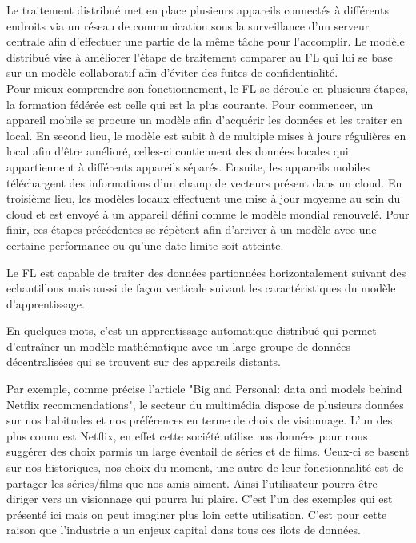 \documentclass[12pt,a4paper]{report}
\begin{document}
Le traitement distribué met en place plusieurs appareils connectés à différents endroits via un réseau de communication sous la surveillance d'un serveur centrale afin d'effectuer une partie de la même tâche pour l'accomplir. Le modèle distribué vise à améliorer l'étape de traitement comparer au FL qui lui se base sur un modèle collaboratif afin d'éviter des fuites de confidentialité.\\

Pour mieux comprendre son fonctionnement, le FL se déroule en plusieurs étapes, la formation fédérée est celle qui est la plus courante. Pour commencer, un appareil mobile se procure un modèle afin d'acquérir les données et les traiter en local. En second lieu, le modèle est subit à de multiple mises à jours régulières en local afin d'être amélioré, celles-ci contiennent des données locales qui appartiennent à différents appareils séparés. Ensuite, les appareils mobiles téléchargent des informations d'un champ de vecteurs présent dans un cloud. En troisième lieu, les modèles locaux effectuent une mise à jour moyenne au sein du cloud et est envoyé à un appareil défini comme le modèle mondial renouvelé. Pour finir, ces étapes précédentes se répètent afin d'arriver à un modèle avec une certaine performance ou qu'une date limite soit atteinte.

Le FL est capable de traiter des données partionnées horizontalement suivant des echantillons mais aussi de façon verticale suivant les caractéristiques du modèle d'apprentissage.

En quelques mots, c'est un apprentissage automatique distribué qui permet d'entraîner un modèle mathématique avec un large groupe de données décentralisées qui se trouvent sur des appareils distants.

Par exemple, comme précise l'article "Big and Personal: data and models behind Netflix recommendations", le secteur du multimédia dispose de plusieurs données sur nos habitudes et nos préférences en terme de choix de visionnage. L'un des plus connu est Netflix, en effet cette société utilise nos données pour nous suggérer des choix parmis un large éventail de séries et de films. Ceux-ci se basent sur nos historiques, nos choix du moment, une autre de leur fonctionnalité est de partager les séries/films que nos amis aiment. Ainsi l'utilisateur pourra être diriger vers un visionnage qui pourra lui plaire. C'est l'un des exemples qui est présenté ici mais on peut imaginer plus loin cette utilisation. C'est pour cette raison que l'industrie a un enjeux capital dans tous ces ilots de données.\\
\end{document}
